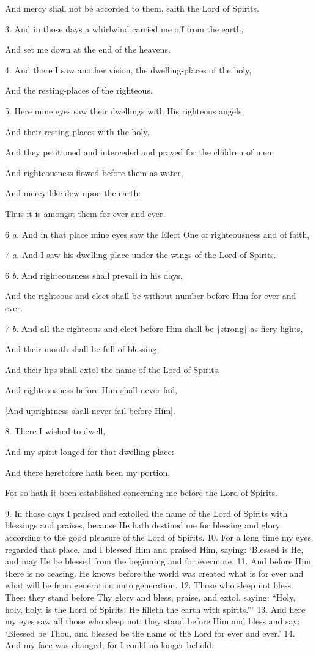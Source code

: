 And mercy shall not be accorded to them, saith the Lord of Spirits.

3. And in those days a whirlwind carried me off from the earth,

And set me down at the end of the heavens.

4. And there I saw another vision, the dwelling-places of the holy,

And the resting-places of the righteous.

5. Here mine eyes saw their dwellings with His righteous angels,

And their resting-places with the holy.

And they petitioned and interceded and prayed for the children of men.

And righteousness flowed before them as water,

And mercy like dew upon the earth:

Thus it is amongst them for ever and ever.

6 \emph{a.} And in that place mine eyes saw the Elect One of righteousness and of faith,

7 \emph{a.} And I saw his dwelling-place under the wings of the Lord of Spirits.

6 \emph{b.} And righteousness shall prevail in his days,

And the righteous and elect shall be without number before Him for ever and ever.

7 \emph{b.} And all the righteous and elect before Him shall be †strong† as fiery lights,

And their mouth shall be full of blessing,

And their lips shall extol the name of the Lord of Spirits,

And righteousness before Him shall never fail,

[And uprightness shall never fail before Him].

8. There I wished to dwell,

And my spirit longed for that dwelling-place:

And there heretofore hath been my portion,

For so hath it been established concerning me before the Lord of Spirits.

9. In those days I praised and extolled the name
of the Lord of Spirits with blessings and praises,
because He hath destined me for blessing and glory
according to the good pleasure of the Lord of Spirits.
10. For a long time my eyes regarded that place,
and I blessed Him and praised Him, saying: ‘Blessed
is He, and may He be blessed from the beginning and
for evermore. 11. And before Him there is no
ceasing. He knows before the world was created
what is for ever and what will be from generation
unto generation. 12. Those who sleep not bless
Thee: they stand before Thy glory and bless, praise,
and extol, saying: “Holy, holy, holy, is the Lord
of Spirits: He filleth the earth with spirits.”’
13. And here my eyes saw all those who sleep not:
they stand before Him and bless and say: ‘Blessed
be Thou, and blessed be the name of the Lord for
ever and ever.’ 14. And my face was changed; for
I could no longer behold.

